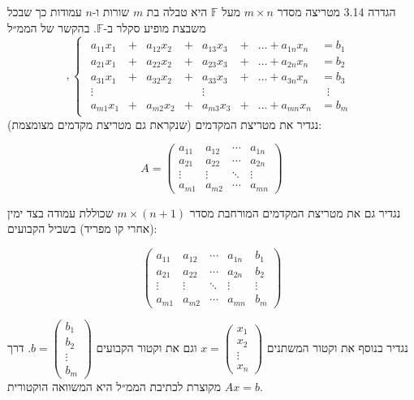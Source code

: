 \documentclass[a4paper, 11pt]{article}
\begin{document}
\begin{envbox}[defcolor]{הגדרה 3.14}
מטריצה מסדר $m\times n$ מעל $\mathbb F$ היא טבלה בת $m$ שורות ו-$n$ עמודות כך שבכל משבצת מופיע סקלר ב-$\mathbb F$. בהקשר של הממ״ל 
\[
,\begin{cases}
\begin{alignedat}{7}
a_{11}x_1 &{}+{}& a_{12}x_2 &{}+{}& a_{13}x_3 &{}+{}& \dots + a_{1n}x_n &= b_1 \\[4pt]
a_{21}x_1 &{}+{}& a_{22}x_2 &{}+{}& a_{23}x_3 &{}+{}& \dots + a_{2n}x_n &= b_2 \\[4pt]
a_{31}x_1 &{}+{}& a_{32}x_2 &{}+{}& a_{33}x_3 &{}+{}& \dots + a_{3n}x_n &= b_3 \\[4pt]
\vdots& & & & \vdots & & & \;\;\vdots \\[4pt]
a_{m1}x_1 &{}+{}& a_{m2}x_2 &{}+{}& a_{m3}x_3 &{}+{}& \dots + a_{mn}x_n &= b_m
\end{alignedat}
\end{cases}
\]
 נגדיר את מטריצת המקדמים (שנקראת גם מטריצת מקדמים מצומצמת):

\[
A=\begin{pmatrix}a_{11} & a_{12} & \cdots & a_{1n}\\
a_{21} & a_{22} & \cdots & a_{2n}\\
\vdots & \vdots & \ddots & \vdots\\
a_{m1} & a_{m2} & \cdots & a_{mn}
\end{pmatrix}
\]

נגדיר גם את מטריצת המקדמים המורחבת מסדר $m\times(n+1)$ שכוללת עמודה בצד ימין (אחרי קו מפריד) בשביל הקבועים:

\[
\left( \begin{array}{cccc|c}
    a_{11} & a_{12} & \cdots & a_{1n} & b_1 \\
    a_{21} & a_{22} & \cdots & a_{2n} & b_2 \\
    \vdots & \vdots & \ddots & \vdots & \vdots \\
    a_{m1} & a_{m2} & \cdots & a_{mn} & b_m
\end{array} \right)
\]

נגדיר בנוסף את וקטור המשתנים $x=\begin{pmatrix}x_1\\
x_2\\
\vdots\\
x_n
\end{pmatrix}$ וגם את וקטור הקבועים $b=\begin{pmatrix}b_1\\
b_2\\
\vdots\\
b_m
\end{pmatrix}$. 
דרך מקוצרת לכתיבת הממ״ל  היא המשוואה הוקטורית $Ax=b$.
\end{envbox}
\end{document}
